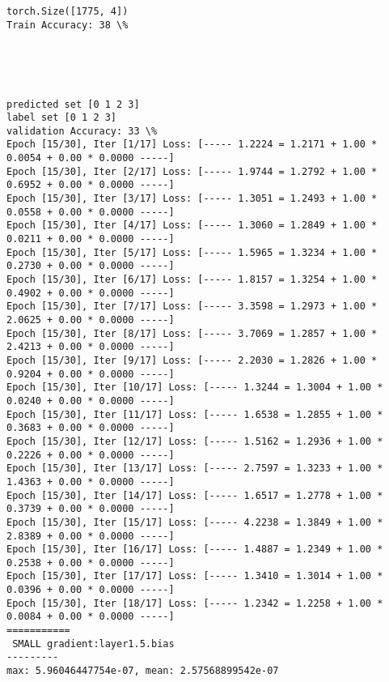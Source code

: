\documentclass[11pt]{article}
\begin{document}
    \begin{Verbatim}[commandchars=\\\{\}]
torch.Size([1775, 4])
Train Accuracy: 38 \%

    \end{Verbatim}

    \begin{center}
    \end{center}
    { \hspace*{\fill} \\}
    
    \begin{center}
    \end{center}
    { \hspace*{\fill} \\}
    
    \begin{Verbatim}[commandchars=\\\{\}]
predicted set [0 1 2 3]
label set [0 1 2 3]
validation Accuracy: 33 \%
Epoch [15/30], Iter [1/17] Loss: [----- 1.2224 = 1.2171 + 1.00 * 0.0054 + 0.00 * 0.0000 -----]
Epoch [15/30], Iter [2/17] Loss: [----- 1.9744 = 1.2792 + 1.00 * 0.6952 + 0.00 * 0.0000 -----]
Epoch [15/30], Iter [3/17] Loss: [----- 1.3051 = 1.2493 + 1.00 * 0.0558 + 0.00 * 0.0000 -----]
Epoch [15/30], Iter [4/17] Loss: [----- 1.3060 = 1.2849 + 1.00 * 0.0211 + 0.00 * 0.0000 -----]
Epoch [15/30], Iter [5/17] Loss: [----- 1.5965 = 1.3234 + 1.00 * 0.2730 + 0.00 * 0.0000 -----]
Epoch [15/30], Iter [6/17] Loss: [----- 1.8157 = 1.3254 + 1.00 * 0.4902 + 0.00 * 0.0000 -----]
Epoch [15/30], Iter [7/17] Loss: [----- 3.3598 = 1.2973 + 1.00 * 2.0625 + 0.00 * 0.0000 -----]
Epoch [15/30], Iter [8/17] Loss: [----- 3.7069 = 1.2857 + 1.00 * 2.4213 + 0.00 * 0.0000 -----]
Epoch [15/30], Iter [9/17] Loss: [----- 2.2030 = 1.2826 + 1.00 * 0.9204 + 0.00 * 0.0000 -----]
Epoch [15/30], Iter [10/17] Loss: [----- 1.3244 = 1.3004 + 1.00 * 0.0240 + 0.00 * 0.0000 -----]
Epoch [15/30], Iter [11/17] Loss: [----- 1.6538 = 1.2855 + 1.00 * 0.3683 + 0.00 * 0.0000 -----]
Epoch [15/30], Iter [12/17] Loss: [----- 1.5162 = 1.2936 + 1.00 * 0.2226 + 0.00 * 0.0000 -----]
Epoch [15/30], Iter [13/17] Loss: [----- 2.7597 = 1.3233 + 1.00 * 1.4363 + 0.00 * 0.0000 -----]
Epoch [15/30], Iter [14/17] Loss: [----- 1.6517 = 1.2778 + 1.00 * 0.3739 + 0.00 * 0.0000 -----]
Epoch [15/30], Iter [15/17] Loss: [----- 4.2238 = 1.3849 + 1.00 * 2.8389 + 0.00 * 0.0000 -----]
Epoch [15/30], Iter [16/17] Loss: [----- 1.4887 = 1.2349 + 1.00 * 0.2538 + 0.00 * 0.0000 -----]
Epoch [15/30], Iter [17/17] Loss: [----- 1.3410 = 1.3014 + 1.00 * 0.0396 + 0.00 * 0.0000 -----]
Epoch [15/30], Iter [18/17] Loss: [----- 1.2342 = 1.2258 + 1.00 * 0.0084 + 0.00 * 0.0000 -----]
===========
 SMALL gradient:layer1.5.bias
---------
max: 5.96046447754e-07, mean: 2.57568899542e-07

    \end{Verbatim}
\end{document}
